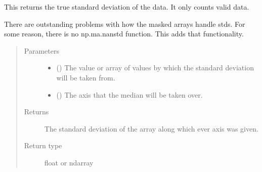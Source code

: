 \documentclass[letterpaper,10pt,english]{sphinxmanual}
\begin{document}
\begin{fulllineitems}
\label{\detokenize{docstrings/ifa_smeargle.core.mathematics:ifa_smeargle.core.mathematics.ifas_masked_std}}
This returns the true standard deviation of the data. It
only counts valid data.

There are outstanding problems with how the masked arrays
handle stds. For some reason, there is no np.ma.nanstd
function. This adds that functionality.
\begin{quote}\begin{description}
\item[{Parameters}] \leavevmode\begin{itemize}
\item {} 
 () \textendash{} The value or array of values by which the standard deviation
will be taken from.

\item {} 
 () \textendash{} The axis that the median will be taken over.

\end{itemize}

\item[{Returns}] \leavevmode
{} \textendash{} The standard deviation of the array along which ever axis
was given.

\item[{Return type}] \leavevmode
float or ndarray

\end{description}\end{quote}

\end{fulllineitems}

\end{document}
